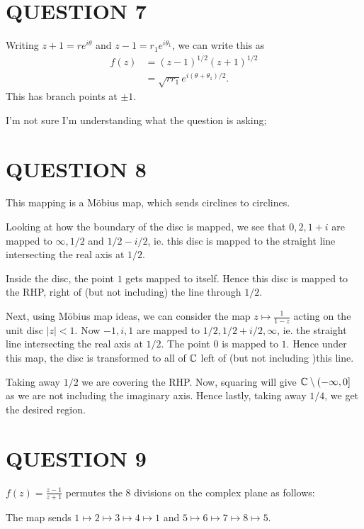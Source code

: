 \documentclass[a4paper]{article}
\begin{document}
\section{QUESTION 7}

Writing $z + 1 = r e^{i\theta}$ and $z - 1 = r_1 e^{i \theta_1}$, we can write this as
\begin{align*}
f(z) &= (z-1)^{1/2}(z+1)^{1/2}\\
&= \sqrt{r r_{1}} e^{i(\theta + \theta_{1})/2}   .
\end{align*}
This has branch points at $\pm 1$.

I'm not sure I'm understanding what the question is asking;
\section{QUESTION 8}

This mapping is a M\"obius map, which sends circlines to circlines. 

Looking at how the boundary of the disc is mapped, we see that $ 0,2,1+i $ are mapped to $ \infty,1/2 $ and $ 1/2 - i/2$, ie. this disc is mapped to the straight line intersecting the real axis at $ 1/2 $.

 Inside the disc, the point $ 1 $ gets mapped to itself. Hence this disc is mapped to the RHP, right of (but not including) the line through $ 1/2 $. 
 
 
Next, using M\"obius map ideas, we can consider the map $ z \mapsto \frac{1}{1 - z} $ acting on the unit disc $ | z | < 1 $. Now $ -1,i,1 $ are mapped to $ 1/2, 1/2 + i/2 ,\infty $, ie. the straight line intersecting the real axis at $ 1/2 $.  The point $ 0 $ is mapped to $ 1 $. Hence under this map, the disc is transformed to all of $ \mathbb{C} $ left of (but not including )this line. 

Taking away $ 1/2 $ we are covering the RHP. Now, squaring will give $ \mathbb{C} \setminus {(-\infty,0]} $ as we are not including the imaginary axis. Hence lastly, taking away $ 1/4 $, we get the desired region.

 

\section{QUESTION 9}

$f(z) = \frac{z - 1}{z + 1}$ permutes the $8$ divisions on the complex plane as follows:
\begin{center}
\end{center}
The map sends $1 \mapsto 2 \mapsto 3 \mapsto 4 \mapsto 1$ and $5 \mapsto 6 \mapsto 7 \mapsto 8 \mapsto 5$. 
\end{document}

